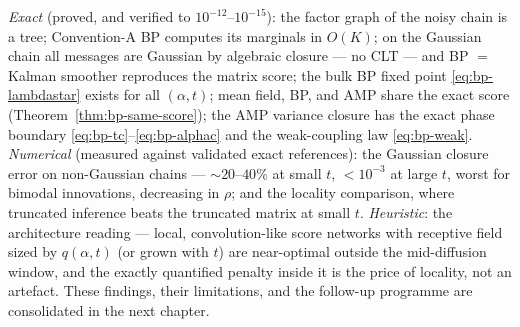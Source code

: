 \emph{Exact} (proved, and verified to $10^{-12}$--$10^{-15}$): the factor
graph of the noisy chain is a tree; Convention-A BP computes its marginals
in $O(K)$; on the Gaussian chain all messages are Gaussian by algebraic
closure --- no CLT --- and BP $=$ Kalman smoother reproduces the matrix
score; the bulk BP fixed point \eqref{eq:bp-lambdastar} exists for all
$(\alpha, t)$; mean field, BP, and AMP share the exact score
(Theorem~\ref{thm:bp-same-score}); the AMP variance closure has the exact
phase boundary \eqref{eq:bp-tc}--\eqref{eq:bp-alphac} and the
weak-coupling law \eqref{eq:bp-weak}.
\emph{Numerical} (measured against validated exact references): the
Gaussian closure error on non-Gaussian chains ---
$\sim\!20$--$40\%$ at small $t$, $< 10^{-3}$ at large $t$, worst for
bimodal innovations, decreasing in $\rho$; and the locality comparison,
where truncated inference beats the truncated matrix at small $t$.
\emph{Heuristic}: the architecture reading --- local, convolution-like
score networks with receptive field sized by $q(\alpha, t)$ (or grown with
$t$) are near-optimal outside the mid-diffusion window, and the exactly
quantified penalty inside it is the price of locality, not an artefact.
These findings, their limitations, and the follow-up programme are
consolidated in the next chapter.
